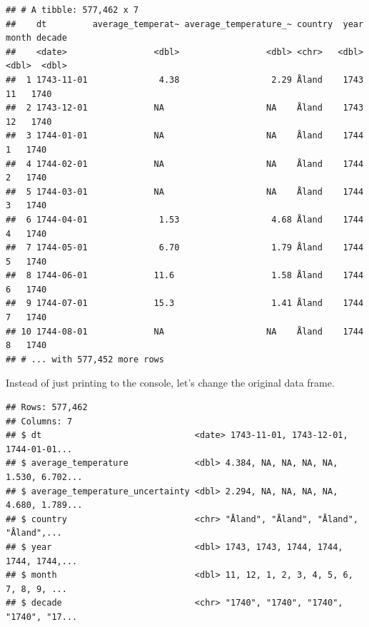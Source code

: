 \documentclass[
]{book}
\newenvironment{Shaded}{\begin{snugshade}}{\end{snugshade}}
\newcommand{\CharTok}[1]{\textcolor[rgb]{0.31,0.60,0.02}{#1}}
\newcommand{\CommentTok}[1]{\textcolor[rgb]{0.56,0.35,0.01}{\textit{#1}}}
\newcommand{\DataTypeTok}[1]{\textcolor[rgb]{0.13,0.29,0.53}{#1}}
\newcommand{\KeywordTok}[1]{\textcolor[rgb]{0.13,0.29,0.53}{\textbf{#1}}}
\newcommand{\NormalTok}[1]{#1}
\newcommand{\OperatorTok}[1]{\textcolor[rgb]{0.81,0.36,0.00}{\textbf{#1}}}
\newcommand{\StringTok}[1]{\textcolor[rgb]{0.31,0.60,0.02}{#1}}
\begin{document}
\begin{verbatim}
## # A tibble: 577,462 x 7
##    dt         average_temperat~ average_temperature_~ country  year month decade
##    <date>                 <dbl>                 <dbl> <chr>   <dbl> <dbl>  <dbl>
##  1 1743-11-01              4.38                  2.29 Åland    1743    11   1740
##  2 1743-12-01             NA                    NA    Åland    1743    12   1740
##  3 1744-01-01             NA                    NA    Åland    1744     1   1740
##  4 1744-02-01             NA                    NA    Åland    1744     2   1740
##  5 1744-03-01             NA                    NA    Åland    1744     3   1740
##  6 1744-04-01              1.53                  4.68 Åland    1744     4   1740
##  7 1744-05-01              6.70                  1.79 Åland    1744     5   1740
##  8 1744-06-01             11.6                   1.58 Åland    1744     6   1740
##  9 1744-07-01             15.3                   1.41 Åland    1744     7   1740
## 10 1744-08-01             NA                    NA    Åland    1744     8   1740
## # ... with 577,452 more rows
\end{verbatim}

Instead of just printing to the console, let's change the original data frame.

\begin{Shaded}
\end{Shaded}

\begin{verbatim}
## Rows: 577,462
## Columns: 7
## $ dt                              <date> 1743-11-01, 1743-12-01, 1744-01-01...
## $ average_temperature             <dbl> 4.384, NA, NA, NA, NA, 1.530, 6.702...
## $ average_temperature_uncertainty <dbl> 2.294, NA, NA, NA, NA, 4.680, 1.789...
## $ country                         <chr> "Åland", "Åland", "Åland", "Åland",...
## $ year                            <dbl> 1743, 1743, 1744, 1744, 1744, 1744,...
## $ month                           <dbl> 11, 12, 1, 2, 3, 4, 5, 6, 7, 8, 9, ...
## $ decade                          <chr> "1740", "1740", "1740", "1740", "17...
\end{verbatim}
\end{document}
